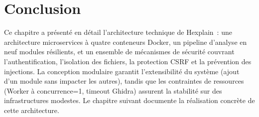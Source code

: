 \section{Conclusion}

Ce chapitre a présenté en détail l'architecture technique de Hexplain~: une architecture microservices à quatre conteneurs Docker, un pipeline d'analyse en neuf modules résilients, et un ensemble de mécanismes de sécurité couvrant l'authentification, l'isolation des fichiers, la protection CSRF et la prévention des injections. La conception modulaire garantit l'extensibilité du système (ajout d'un module sans impacter les autres), tandis que les contraintes de ressources (Worker à concurrence=1, timeout Ghidra) assurent la stabilité sur des infrastructures modestes. Le chapitre suivant documente la réalisation concrète de cette architecture.
